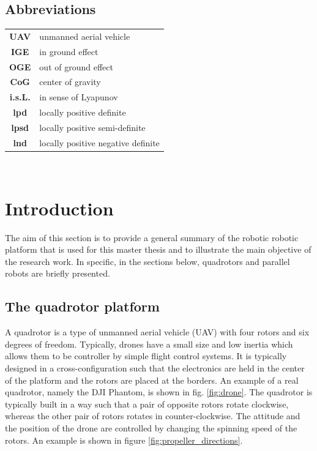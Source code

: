 \documentclass{thesisreport}
\begin{document}
 
 
 \newpage
 
  \section*{Abbreviations}
 \begin{tabular}{cp{}}
  \textbf{UAV} & unmanned aerial vehicle \\
  \textbf{IGE} & in ground effect \\
  \textbf{OGE} & out of ground effect \\
  \textbf{CoG} & center of gravity \\
  \textbf{i.s.L.} & in sense of Lyapunov \\
  \textbf{lpd} & locally positive definite \\
  \textbf{lpsd} & locally positive semi-definite \\
  \textbf{lnd} & locally positive negative definite \\
\end{tabular}\\
 \newpage
 
 \listoffigures
 
\listoftables
 
 \tableofcontents
 
 
 \chapter*{Introduction}
 	The aim of this section is to provide a general summary of the robotic robotic platform that is used for this master thesis and to illustrate the main objective of the research work.
In specific, in the sections below, quadrotors and parallel robots are briefly presented.


 
 
 \section*{The quadrotor platform}

A quadrotor is a type of unmanned aerial vehicle (UAV) with four rotors and six degrees of freedom. Typically, drones have a small size and low inertia which allows them to be controller by simple flight control systems. It is typically designed in a cross-configuration such that the electronics are held in the center of the platform and the rotors are placed at the borders.
An example of a real quadrotor, namely the DJI Phantom, is shown in fig. \ref{fig:drone}. The quadrotor is typically built in a way such that a pair of opposite rotors rotate clockwise, whereas the other pair of rotors rotates in counter-clockwise.
The attitude and the position of the drone are controlled by changing the spinning speed of the rotors. An example is shown in figure \ref{fig:propeller_directions}.
\end{document}
